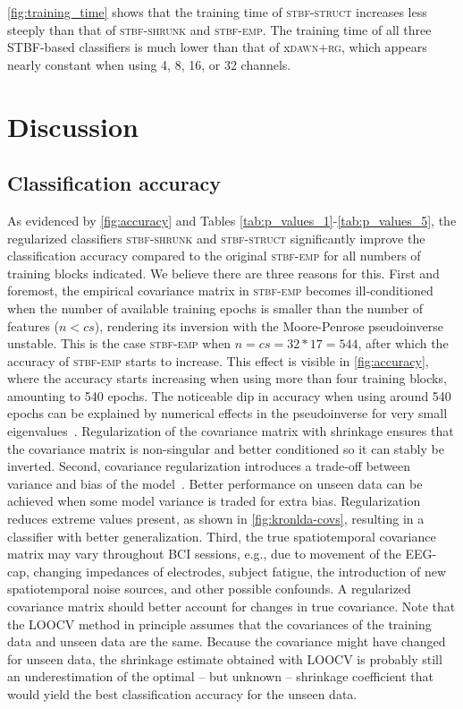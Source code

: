 \begin{refsection}
	\autoref{fig:training_time} shows that the training time of
	\textsc{stbf-struct} increases less steeply than that of \textsc{stbf-shrunk}
	and \textsc{stbf-emp}. The training time of all three STBF-based classifiers is
	much lower than that of x\textsc{dawn+rg}, which appears nearly constant when using
	4, 8, 16, or 32 channels.

	\section{Discussion}

	\subsection{Classification accuracy}
	As evidenced by \autoref{fig:accuracy} and Tables \ref{tab:p_values_1}-\ref{tab:p_values_5}, the regularized classifiers \textsc{stbf-shrunk}
	and \textsc{stbf-struct} significantly improve the classification accuracy
	compared to the original \textsc{stbf-emp} for all numbers of training blocks
	indicated.
	We believe there are three reasons for this.
	First and foremost, the empirical covariance matrix in \textsc{stbf-emp} becomes
	ill-conditioned when the number of available training epochs is smaller than
	the number of features ($n<cs$), rendering its inversion with the
	Moore-Penrose pseudoinverse unstable.
	This is the case \textsc{stbf-emp} when $n=cs=32*17=544$, after which the
	accuracy of \textsc{stbf-emp} starts to increase.
	This effect is visible in \autoref{fig:accuracy}, where the accuracy starts
	increasing when using more than four training blocks, amounting to 540 epochs.
	The noticeable dip in accuracy when using around 540 epochs can be explained by
	numerical effects in the pseudoinverse for very small
	eigenvalues~\cite{Blankertz2011, Raudys1998, Schaefer2004,
		Kraemer2009}.
	Regularization of the covariance matrix with shrinkage ensures that the
	covariance matrix is non-singular and better conditioned so it can stably be inverted.
	Second, covariance regularization introduces a trade-off between variance and bias of the model~\cite{Ledoit2004}.
	Better performance on unseen data can be achieved when some model variance is
	traded for extra bias.
	Regularization reduces extreme values present, as shown in
	\autoref{fig:kronlda-covs}, resulting in a classifier with
	better generalization.
	Third, the true spatiotemporal covariance matrix may vary throughout BCI
	sessions, e.g., due to movement of the EEG-cap, changing impedances of
	electrodes, subject fatigue, the introduction of new spatiotemporal noise
	sources, and other possible confounds.
	A regularized covariance matrix should better account for changes in true covariance.
	Note that the LOOCV method in principle assumes that the covariances of
	the training data and unseen data are the same.
	Because the covariance might have changed for unseen data, the shrinkage
	estimate obtained with LOOCV is probably still an
	underestimation of the optimal -- but unknown -- shrinkage coefficient that
	would yield the best classification accuracy for the unseen data.


\end{refsection}
